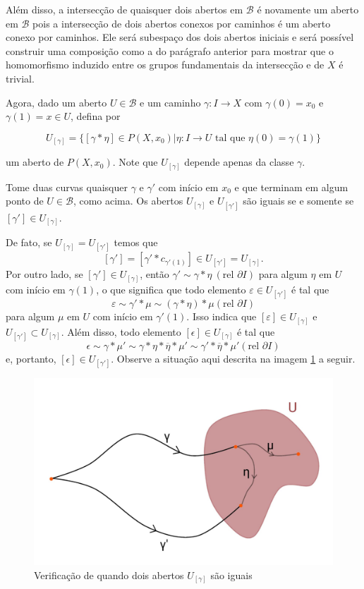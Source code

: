 \begin{dem}
     Além disso, a intersecção de quaisquer dois abertos em $\mathcal{B}$ é novamente um aberto em $\mathcal{B}$ pois a intersecção de dois abertos conexos por caminhos é um aberto conexo por caminhos. Ele será subespaço dos dois abertos iniciais e será possível construir uma composição como a do parágrafo anterior para mostrar que o homomorfismo induzido entre os grupos fundamentais da intersecção e de $X$ é trivial.

     Agora, dado um aberto $U\in \mathcal{B}$ e um caminho $\gamma:I\rightarrow X$ com $\gamma(0)=x_0$ e $\gamma(1)=x\in U$, defina por

     $$U_{[\gamma]}=\{[\gamma* \eta]\in P(X,x_0)| \eta:I\rightarrow U\text{ tal que } \eta(0)=\gamma(1)\}$$


     um aberto de $P(X,x_0)$. Note que $U_{[\gamma]}$ depende apenas da classe $\gamma$.

     Tome duas curvas quaisquer $\gamma$ e $\gamma'$ com início em $x_0$ e que terminam em algum ponto de $U\in \mathcal{B}$, como acima. Os abertos $U_{[\gamma]}$ e $U_{[\gamma']}$ são iguais se e somente se $[\gamma']\in U_{[\gamma]}$.
     
     De fato, se $U_{[\gamma]}=U_{[\gamma']}$ temos que $$[\gamma']=[\gamma'*c_{\gamma'(1)}]\in U_{[\gamma']}=U_{[\gamma]}.$$ Por outro lado, se $[\gamma']\in U_{[\gamma]}$, então $\gamma'\sim \gamma *\eta ~(\text{rel }\partial I)$ para algum $\eta$ em $U$ com início em $\gamma(1)$, o que significa que todo elemento $\varepsilon\in U_{[\gamma']}$ é tal que $$\varepsilon\sim\gamma'*\mu\sim (\gamma*\eta)*\mu (\text{rel }\partial I)$$ para algum $\mu$ em $U$ com início em $\gamma'(1)$. Isso indica que $[\varepsilon]\in U_{[\gamma]}$ e $U_{[\gamma']}\subset U_{[\gamma]}$. Além disso, todo elemento $[\epsilon] \in U_{[\gamma]}$ é tal que $$\epsilon \sim \gamma * \mu' \sim \gamma*\eta*\overline{\eta}*\mu'\sim \gamma' *\overline{\eta}*\mu'(\text{rel }\partial I)$$ e, portanto, $[\epsilon]\in U_{[\gamma']}$. Observe a situação aqui descrita na imagem \ref{fig:cobertura-P(X,x_0)} a seguir.

     \begin{figure}[h!]
         \centering
         \includegraphics[width=0.8\linewidth]{conteudo/fig-cobertura-P(X,x_0).jpeg}
         \caption{Verificação de quando dois abertos $U_{[\gamma]}$ são iguais}
         \label{fig:cobertura-P(X,x_0)}
     \end{figure} 


\end{dem}
